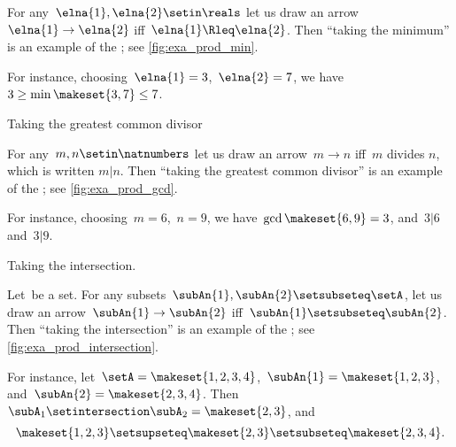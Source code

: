 \begin{example}
    \label{exa:min-as-prod}
    For any~$\elna{1},\elna{2}\setin \reals$ let us draw an arrow~$\elna{1}\to \elna{2}$ iff~$\elna{1}\Rleq \elna{2}$.
    Then ``taking the minimum'' is an example of the ; see \cref{fig:exa_prod_min}.

    For instance, choosing~$\elna{1} = 3$,~$\elna{2} = 7$, we have~$3 \geq \min \makeset{3, 7} \leq 7$.
\end{example}

\begin{marginfigure}
    \centering
    \caption{Taking the greatest common divisor}
    \label{fig:exa_prod_gcd}
\end{marginfigure}

\begin{example}
    \label{exa:gcd-as-prod}
    For any~$m, n \setin \natnumbers$ let us draw an arrow~$m \to n$ iff~$m$ divides $n$, which is written $m | n$.
    Then ``taking the greatest common divisor'' is an example of the ; see \cref{fig:exa_prod_gcd}.

    For instance, choosing~$m = 6$,~$n = 9$, we have~$\gcd \makeset{6, 9 } = 3$, and~$3 | 6$ and~$3 | 9$.
\end{example}

\begin{marginfigure}
    \centering
    \caption{Taking the intersection.}
    \label{fig:exa_prod_intersection}
\end{marginfigure}

\begin{example}
    \label{exa:intersection-as-prod}
    Let~\setA be a set.
    For any subsets~$\subAn{1}, \subAn{2} \setsubseteq \setA$, let us draw an arrow~$\subAn{1} \to \subAn{2}$ iff~$\subAn{1} \setsubseteq \subAn{2}$.
    Then ``taking the intersection'' is an example of the ; see \cref{fig:exa_prod_intersection}.

    For instance, let~$\setA = \makeset{ 1, 2, 3, 4 }$,~$\subAn{1} = \makeset{ 1, 2, 3 }$, and~$\subAn{2} = \makeset{2, 3, 4 }$.
    Then~$\subA_1 \setintersection \subA_2 = \makeset{2, 3 }$, and
    \begin{equation}
        \makeset{ 1, 2, 3 } \setsupseteq \makeset{2, 3 } \setsubseteq \makeset{2, 3, 4 }.
    \end{equation}
\end{example}

